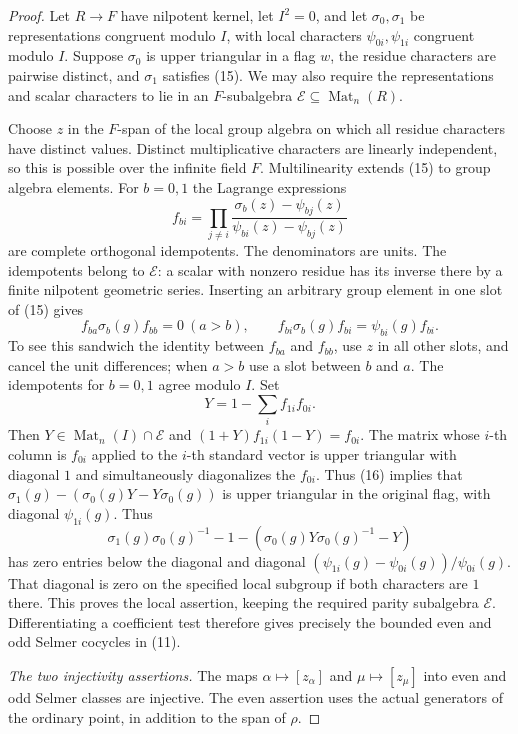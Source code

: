 \begin{proof}
Let $R\to F$ have nilpotent kernel, let $I^2=0$, and let
$\sigma_0,\sigma_1$ be representations congruent modulo $I$,
with local characters $\psi_{0i},\psi_{1i}$ congruent modulo $I$.
Suppose $\sigma_0$ is upper triangular in a flag $w$, the
residue characters are pairwise distinct, and $\sigma_1$
satisfies (15).  We may also require the representations and
scalar characters to lie in an $F$-subalgebra
$\mathcal E\subseteq\operatorname{Mat}_n(R)$.

Choose $z$ in the $F$-span of the local group algebra on which
all residue characters have distinct values.
Distinct multiplicative characters are linearly independent,
so this is possible over the infinite field $F$.
Multilinearity extends (15) to group algebra elements.
For $b=0,1$ the Lagrange expressions
\[
 f_{bi}=
 \prod_{j\ne i}
 \frac{\sigma_b(z)-\psi_{bj}(z)}
      {\psi_{bi}(z)-\psi_{bj}(z)}
\]
are complete orthogonal idempotents.
The denominators are units.  The idempotents belong to
$\mathcal E$: a scalar with nonzero residue has its inverse
there by a finite nilpotent geometric series.
Inserting an arbitrary group element in one slot of (15) gives
\[
 f_{ba}\sigma_b(g)f_{bb}=0\ (a>b),\qquad
 f_{bi}\sigma_b(g)f_{bi}=\psi_{bi}(g)f_{bi}.                     \tag{16}
\]
To see this sandwich the identity between $f_{ba}$ and $f_{bb}$,
use $z$ in all other slots, and cancel the unit differences;
when $a>b$ use a slot between $b$ and $a$.
The idempotents for $b=0,1$ agree modulo $I$.  Set
\[
                     Y=1-\sum_i f_{1i}f_{0i}.
\]
Then $Y\in\operatorname{Mat}_n(I)\cap\mathcal E$ and
$(1+Y)f_{1i}(1-Y)=f_{0i}$.
The matrix whose $i$-th column is $f_{0i}$ applied to the
$i$-th standard vector is upper triangular with diagonal $1$
and simultaneously diagonalizes the $f_{0i}$.
Thus (16) implies that
$\sigma_1(g)-(\sigma_0(g)Y-Y\sigma_0(g))$ is upper triangular
in the original flag, with diagonal $\psi_{1i}(g)$.
Thus
\[
 \sigma_1(g)\sigma_0(g)^{-1}-1
             -(\sigma_0(g)Y\sigma_0(g)^{-1}-Y)
\]
has zero entries below the diagonal and diagonal
$(\psi_{1i}(g)-\psi_{0i}(g))/\psi_{0i}(g)$.
That diagonal is zero on the specified local subgroup if both
characters are $1$ there.  This proves the local assertion,
keeping the required parity subalgebra $\mathcal E$.
Differentiating a coefficient test therefore gives precisely
the bounded even and odd Selmer cocycles in (11).

\emph{The two injectivity assertions.}
The maps $\alpha\mapsto[z_\alpha]$ and $\mu\mapsto[z_\mu]$
into even and odd Selmer classes are injective.
The even assertion uses the actual generators of the ordinary
point, in addition to the span of $\rho$.


\end{proof}
